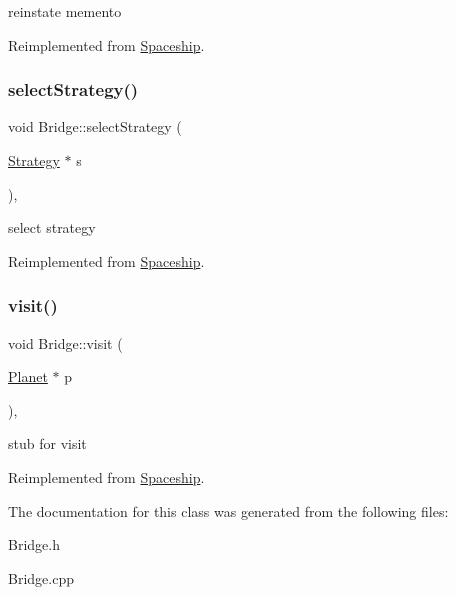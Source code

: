 reinstate memento 

Reimplemented from \hyperlink{classSpaceship_ab075c869473344b6471c8e28ca7ea61e}{Spaceship}.

\mbox{\label{classBridge_a07283d7cf98c500020b1f91594f48678}} 
\subsubsection{\texorpdfstring{select\+Strategy()}{selectStrategy()}}
{\footnotesize\ttfamily void Bridge\+::select\+Strategy (\begin{DoxyParamCaption}\item[{\hyperlink{classStrategy}{Strategy} $\ast$}]{s }\end{DoxyParamCaption})\hspace{0.3cm}{\ttfamily [inline]}, {\ttfamily [virtual]}}

select strategy 

Reimplemented from \hyperlink{classSpaceship_a93be2d9d2b675ef978d866d4cd7a6524}{Spaceship}.

\mbox{\label{classBridge_aa89e0ced4a914240ab354f11f7b33363}} 
\subsubsection{\texorpdfstring{visit()}{visit()}}
{\footnotesize\ttfamily void Bridge\+::visit (\begin{DoxyParamCaption}\item[{\hyperlink{classPlanet}{Planet} $\ast$}]{p }\end{DoxyParamCaption})\hspace{0.3cm}{\ttfamily [inline]}, {\ttfamily [virtual]}}

stub for visit 

Reimplemented from \hyperlink{classSpaceship}{Spaceship}.



The documentation for this class was generated from the following files\+:\begin{DoxyCompactItemize}
\item 
Bridge.\+h\item 
Bridge.\+cpp\end{DoxyCompactItemize}

